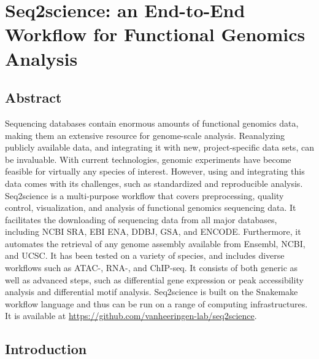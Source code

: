 \chapter{Seq2science: an End-to-End Workflow for Functional Genomics Analysis}\thumbforchapter
\newpage

\section{Abstract}

Sequencing databases contain enormous amounts of functional genomics data, making them an extensive resource for genome-scale analysis. Reanalyzing publicly available data, and integrating it with new, project-specific data sets, can be invaluable. With current technologies, genomic experiments have become feasible for virtually any species of interest. However, using and integrating this data comes with its challenges, such as standardized and reproducible analysis. Seq2science is a multi-purpose workflow that covers preprocessing, quality control, visualization, and analysis of functional genomics sequencing data. It facilitates the downloading of sequencing data from all major databases, including NCBI SRA, EBI ENA, DDBJ, GSA, and ENCODE. Furthermore, it automates the retrieval of any genome assembly available from Ensembl, NCBI, and UCSC. It has been tested on a variety of species, and includes diverse workflows such as ATAC-, RNA-, and ChIP-seq. It consists of both generic as well as advanced steps, such as differential gene expression or peak accessibility analysis and differential motif analysis. Seq2science is built on the Snakemake workflow language and thus can be run on a range of computing infrastructures. It is available at \url{https://github.com/vanheeringen-lab/seq2science}.

\section{Introduction}


